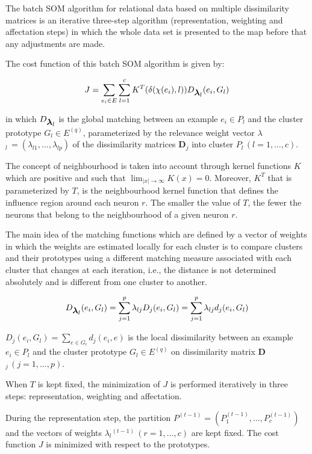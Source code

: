 \documentclass[12pt]{article}
\begin{document}
The batch SOM algorithm for relational data based on multiple dissimilarity matrices is an iterative three-step algorithm (representation, weighting and affectation steps) in which the whole data set is presented to the map before that any adjustments are made.

The cost function of this batch SOM algorithm is given by:

\begin{equation}
J = \sum_{e_i \in E} \sum_{l=1}^c K^T(\delta(\chi(e_i),l)) D_{\mbox{\boldmath$\lambda$\unboldmath$_l$}}(e_i,G_l) 
\end{equation}

\noindent in which $D_{\mbox{\boldmath$\lambda$\unboldmath$_l$}}$ is the global matching between an example $e_i \in P_l$ and the cluster prototype $G_l \in E^{(q)}$, parameterized by the relevance weight vector \boldmath$\lambda$\unboldmath$_l \, = (\lambda_{l1}, \ldots, \lambda_{lp})$ of the dissimilarity matrices \textbf{D}$_j$ into cluster $P_l \, (l=1,\ldots,c)$. 

The concept of neighbourhood is taken into account through kernel functions $K$ which are positive and such that $\lim_{|x| \to \infty} K(x) = 0$. Moreover, $K^T$ that is parameterized by $T$, is the neighbourhood kernel function that defines the influence region around each neuron $r$. The smaller the value of $T$, the fewer the neurons that belong to the neighbourhood of a given neuron $r$.

The main idea of the matching functions which are defined by a vector of weights
in which the weights are estimated locally for each cluster
is to compare clusters and their prototypes using a different matching measure 
associated with each cluster that changes at each iteration, i.e., the distance is
not determined absolutely and is different from one cluster to
another.

$$
D_{\mbox{\boldmath$\lambda$\unboldmath$_l$}}(e_i,G_l) = \sum_{j=1}^p \lambda_{lj} D_j(e_i,G_l) = \sum_{j=1}^p \lambda_{lj} d_j(e_i,G_l)
$$

$D_j(e_i,G_l) = \sum_{e \in G_l} d_j(e_i,e)$  is the local dissimilarity between an example $e_i \in P_l$ and the cluster prototype $G_l \in E^{(q)}$ on dissimilarity matrix \textbf{D}$_j  \, (j=1,\ldots,p)$. 

When $T$ is kept fixed, the minimization of $J$ is performed iteratively in three steps: representation, weighting and affectation.

During the representation step, the partition $P^{(t-1)}=(P_1^{(t-1)},\ldots,P_c^{(t-1)})$ and the vectors of weights \mbox{\boldmath$\lambda$\unboldmath$_l$}$^{(t-1)} \, (r=1,\ldots, c)$ are kept fixed. The cost function $J$ is minimized with respect to the prototypes. 
\end{document}
